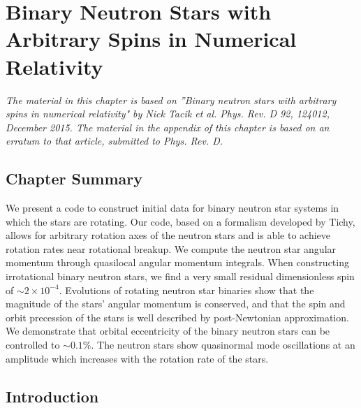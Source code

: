\chapter[BNS with Arbitrary Spins in Numerical Relativity]{Binary Neutron Stars with Arbitrary Spins in Numerical Relativity}
\label{chap:bns}

{\it The material in this chapter is based on ''Binary neutron stars with arbitrary spins in numerical relativity" by Nick Tacik et al. Phys. Rev. D 92, 124012, December 2015. The material in the appendix of this chapter is based on an erratum to that article, submitted to Phys. Rev. D.} 

\section{Chapter Summary}
 We present a code to construct initial data for binary neutron star
  systems in which the stars are rotating. 
  Our code, based on a formalism
  developed by Tichy, allows for arbitrary rotation axes of the
  neutron stars and is able to achieve rotation rates near rotational
  breakup. We compute the neutron star angular momentum through quasilocal angular momentum
    integrals. When constructing irrotational binary neutron stars, we find a very small residual dimensionless spin of $\sim 2\times 10^{-4}$. Evolutions of rotating neutron star binaries show that the magnitude of the
    stars' angular momentum is conserved, and that the spin and
    orbit precession of the stars is well described by
    post-Newtonian approximation. We demonstrate that orbital
  eccentricity of the binary neutron stars can be controlled to
  $\sim 0.1\%$. The neutron stars show
    quasinormal mode oscillations at an amplitude which increases
    with the rotation rate of the stars.
\section{Introduction}



